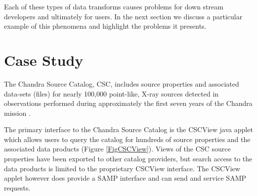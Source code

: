 Each of these types of data transforms causes problems for down stream developers and ultimately for users. In the next section we discuss a particular example of this phenomena and highlight the problems it presents.

\section{Case Study}



The Chandra Source Catalog, CSC,  includes source properties and associated data-sets (files) for nearly 100,000 point-like, X-ray sources detected in observations performed during approximately the first seven years of the Chandra mission \citep{2010ApJS..189...37E}. 


The primary interface to the Chandra Source Catalog is the CSCView java applet \citep{2011ASPC..442..649V} which allows users to query the catalog for hundreds of source properties and the associated  data products (Figure \ref{FigCSCView}). Views of the CSC source properties have been exported to other catalog providers, but search access to the data products is limited to the proprietary CSCView interface.  The CSCView applet however does provide a SAMP \citep{2011arXiv1110.0528T} interface and can send and service SAMP requests.

